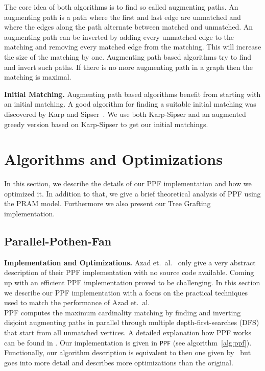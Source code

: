 \documentclass[letterpaper]{article}
\newcommand{\mypar}[1]{{\bf #1.}}
\begin{document}
The core idea of both algorithms is to find so called augmenting paths. An augmenting path is a path where the first 
and last edge are unmatched and where the edges along the path alternate between matched and unmatched. 
An augmenting path can be inverted by adding every unmatched edge to the matching and removing every matched edge from the matching. 
This will increase the size of the matching by one. 
Augmenting path based algorithms try to find and invert such paths. If there is no more augmenting path in a graph then the matching is maximal.

\mypar{Initial Matching}
Augmenting path based algorithms benefit from starting with an initial matching. 
A good algorithm for finding a suitable initial matching was discovered by Karp and Sipser~\cite{KarpS81}.
We use both Karp-Sipser and an augmented greedy version based on Karp-Sipser to get our initial matchings. 

\section{Algorithms and Optimizations}\label{sec:pfopt}

In this section, we describe the details of our PPF implementation and how we optimized it. In addition to that, we 
give a brief theoretical analysis of PPF using the PRAM model. Furthermore we also present our Tree Grafting implementation.

\subsection{Parallel-Pothen-Fan}\label{sec:pf}

\mypar{Implementation and Optimizations} Azad et.\ al.~\cite{Azad:2012} only give a very abstract description of their PPF implementation with no source code available. 
Coming up with an efficient PPF implementation proved to be challenging. 
In this section we describe our PPF implementation with a focus on the practical techniques used to match the performance of Azad et.\ al.\\

PPF computes the maximum cardinality matching by finding and inverting disjoint augmenting paths in parallel through multiple depth-first-searches (DFS)
that start from all unmatched vertices. A detailed explanation how PPF works can be found in \cite{Azad:2012}. 
Our implementation is given in \texttt{PPF} (see algorithm~\ref{alg:ppf}). 
Functionally, our algorithm description is equivalent to then one given by~\cite{Azad:2012} 
but goes into more detail and describes more optimizations than the original.\\
\end{document}
